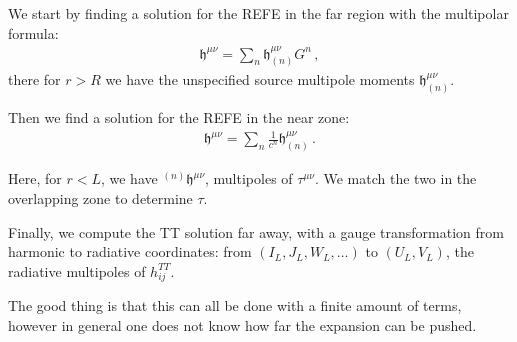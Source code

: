 \documentclass[main.tex]{subfiles}
\begin{document}
We start by finding a solution for the REFE in the far region with the multipolar formula: 
%
\begin{align}
\mathfrak{h}^{\mu \nu } = \sum _{n} \mathfrak{h}_{(n)}^{\mu \nu } G^{n}
\,,
\end{align}
%
there for \(r > R\) we have the unspecified source multipole moments \(\mathfrak{h}^{\mu \nu }_{(n)}\). 

Then we find a solution for the REFE in the near zone: 
%
\begin{align}
\mathfrak{h}^{\mu \nu } = \sum _{n } \frac{1}{c^{n}} \mathfrak{h}^{\mu \nu }_{(n)}
\,.
\end{align}

Here, for \(r < L\), we have \(^{(n)} \mathfrak{h}^{\mu \nu }\), multipoles of \(\tau^{\mu \nu }\). 
We match the two in the overlapping zone to determine \(\tau\). 

Finally, we compute the TT solution far away, with a gauge transformation from harmonic to radiative coordinates: from \((I_L, J_L, W_L, \dots)\) to \((U_L,V_L)\), the radiative multipoles of \(h_{ij}^{TT}\).

The good thing is that this can all be done with a finite amount of terms, however in general one does not know how far the expansion can be pushed.  

\end{document}
